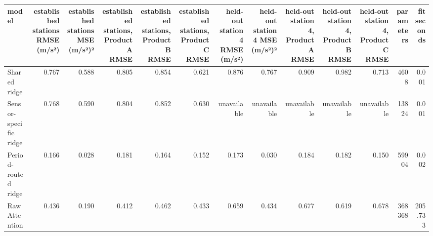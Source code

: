 \begin{tabular}{lrrrrrrrrrrrr}
\toprule
model & established stations RMSE (m/s²) & established stations MSE (m/s²)² & established stations, Product A RMSE & established stations, Product B RMSE & established stations, Product C RMSE & held-out station 4 RMSE (m/s²) & held-out station 4 MSE (m/s²)² & held-out station 4, Product A RMSE & held-out station 4, Product B RMSE & held-out station 4, Product C RMSE & parameters & fit seconds \\
\midrule
Shared ridge & 0.767 & 0.588 & 0.805 & 0.854 & 0.621 & 0.876 & 0.767 & 0.909 & 0.982 & 0.713 & 4608 & 0.001 \\
Sensor-specific ridge & 0.768 & 0.590 & 0.804 & 0.852 & 0.630 & unavailable & unavailable & unavailable & unavailable & unavailable & 13824 & 0.001 \\
Period-routed ridge & 0.166 & 0.028 & 0.181 & 0.164 & 0.152 & 0.173 & 0.030 & 0.184 & 0.182 & 0.150 & 59904 & 0.002 \\
Raw Attention & 0.436 & 0.190 & 0.412 & 0.462 & 0.433 & 0.659 & 0.434 & 0.677 & 0.619 & 0.678 & 368368 & 205.733 \\
\bottomrule
\end{tabular}
